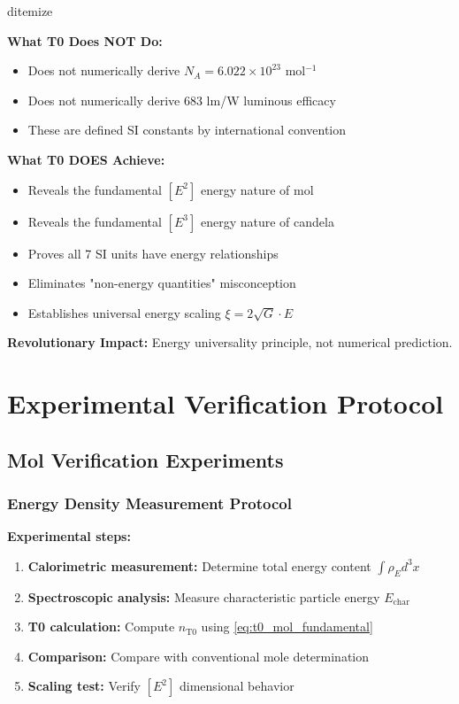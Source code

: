 \documentclass[12pt,a4paper]{article}
\newcommand{\xipar}{\xi}
\newcommand{\rhoE}{\rho_E}
\newcommand{\Echar}{E_{\text{char}}}
\begin{document}
	d{itemize}


\begin{tcolorbox}[colback=orange!5!white,colframe=orange!75!black,title=Critical Clarification: T0 vs SI Definitions]
	\textbf{What T0 Does NOT Do:}
	\begin{itemize}
		\item Does not numerically derive $N_A = 6.022 \times 10^{23}$ mol$^{-1}$
		\item Does not numerically derive 683 lm/W luminous efficacy
		\item These are defined SI constants by international convention
	\end{itemize}
	
	\textbf{What T0 DOES Achieve:}
	\begin{itemize}
		\item Reveals the fundamental $[E^2]$ energy nature of mol
		\item Reveals the fundamental $[E^3]$ energy nature of candela
		\item Proves all 7 SI units have energy relationships
		\item Eliminates "non-energy quantities" misconception
		\item Establishes universal energy scaling $\xipar = 2\sqrt{G} \cdot E$
	\end{itemize}
	
	\textbf{Revolutionary Impact:} Energy universality principle, not numerical prediction.
\end{tcolorbox}

\section{Experimental Verification Protocol}
\label{sec:experimental_verification}

\subsection{Mol Verification Experiments}
\label{subsec:mol_verification}

\subsubsection{Energy Density Measurement Protocol}
\label{subsubsec:mol_energy_protocol}

\textbf{Experimental steps:}
\begin{enumerate}
	\item \textbf{Calorimetric measurement:} Determine total energy content $\int \rhoE d^3x$
	\item \textbf{Spectroscopic analysis:} Measure characteristic particle energy $\Echar$
	\item \textbf{T0 calculation:} Compute $n_{\text{T0}}$ using \cref{eq:t0_mol_fundamental}
	\item \textbf{Comparison:} Compare with conventional mole determination
	\item \textbf{Scaling test:} Verify $[E^2]$ dimensional behavior
\end{enumerate}
\end{document}
